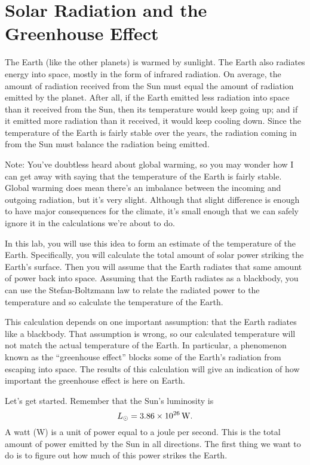 \chapter{Solar Radiation and the Greenhouse Effect}

\bigskip\bigskip

The Earth (like the other planets) is warmed by
sunlight.  The Earth also radiates energy into
space, mostly in the form of infrared radiation.
On average, the amount of radiation received from the Sun
must equal the amount of radiation emitted by the planet.  After 
all, if the Earth emitted less radiation into space than it 
received from the Sun, then its temperature would keep going up;
and if it emitted more radiation than it received, it would keep
cooling down.  Since the temperature of the Earth is fairly stable
over the years, the radiation coming in from the Sun must balance
the radiation being emitted.

Note: You've doubtless heard about global warming, so you may
wonder how I can get away with saying that the temperature
of the Earth is fairly stable. Global warming does mean there's
an imbalance between the incoming and outgoing radiation, but
it's very slight. Although that slight difference is enough to have
major consequences for the climate, it's small enough that we can safely
ignore it in the calculations we're about to do.

In this lab, you will use this idea to form an estimate of the
temperature of the Earth.  Specifically, you will calculate
the total amount of solar power striking the Earth's surface.
Then you will assume that the Earth radiates that same amount
of power back into space.  Assuming that the Earth radiates
as a blackbody, you can use the Stefan-Boltzmann law to 
relate the radiated power to the temperature and so calculate
the temperature of the Earth.

This calculation depends on one important assumption: that the
Earth radiates like a blackbody.  That assumption is wrong,
so our calculated temperature will not match the actual
temperature of the Earth.  In particular, a phenomenon
known as the ``greenhouse effect'' blocks some of the
Earth's radiation from escaping into space.  The results
of this calculation will give an indication of how important
the greenhouse effect is here on Earth.

Let's get started.
Remember that the Sun's luminosity is
$$
L_{\odot}=3.86\times 10^{26}\,{\rm W}.
$$
A watt (W) is a unit of power equal to a joule per second.
This is the total amount of power emitted by the Sun in all directions.
The first thing we want to do is to figure out how much of this
power strikes the Earth.

